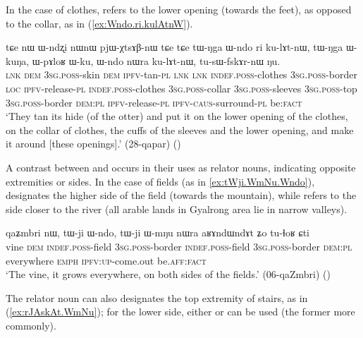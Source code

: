 In the case of clothes,  refers to the lower opening (towards the feet), as opposed to the collar, as in (\ref{ex:Wndo.ri.kulAtnW}).

\begin{exe}
\ex \label{ex:Wndo.ri.kulAtnW}
\gll tɕe nɯ ɯ-ndʐi nɯnɯ pjɯ-χtsɤβ-nɯ tɕe tɕe tɯ-ŋga ɯ-ndo ri ku-lɤt-nɯ, tɯ-ŋga ɯ-kuŋa, ɯ-pɤloʁ ɯ-ku, ɯ-ndo nɯra ku-lɤt-nɯ,  tu-sɯ-fskɤr-nɯ ŋu.   \\
\textsc{lnk} \textsc{dem} \textsc{3sg}.\textsc{poss}-skin \textsc{dem} \textsc{ipfv}-tan-\textsc{pl} \textsc{lnk} \textsc{lnk} \textsc{indef}.\textsc{poss}-clothes \textsc{3sg}.\textsc{poss}-border \textsc{loc} \textsc{ipfv}-release-\textsc{pl} \textsc{indef}.\textsc{poss}-clothes \textsc{3sg}.\textsc{poss}-collar \textsc{3sg}.\textsc{poss}-sleeves \textsc{3sg}.\textsc{poss}-top \textsc{3sg}.\textsc{poss}-border  \textsc{dem}:\textsc{pl}  \textsc{ipfv}-release-\textsc{pl} \textsc{ipfv}-\textsc{caus}-surround-\textsc{pl} be:\textsc{fact} \\
\glt `They tan its hide (of the otter) and put it on the lower opening of the clothes, on the collar of clothes, the cuffs of the sleeves and the lower opening, and make it around [these openings].' (28-qapar)
()
\end{exe} 


A contrast between  and  occurs in their uses as relator nouns, indicating opposite extremities or sides. In the case of fields (as in \ref{ex:tWji.WmNu.Wndo}),  designates the higher side of the field (towards the mountain), while  refers to the side closer to the river (all arable lands in Gyalrong area lie in narrow valleys).

\begin{exe}
\ex \label{ex:tWji.WmNu.Wndo}
\gll  qaʑmbri nɯ, tɯ-ji ɯ-ndo, tɯ-ji ɯ-mŋu nɯra aʁɤndɯndɤt ʑo tu-ɬoʁ ɕti \\
vine \textsc{dem} \textsc{indef}.\textsc{poss}-field \textsc{3sg}.\textsc{poss}-border \textsc{indef}.\textsc{poss}-field \textsc{3sg}.\textsc{poss}-border \textsc{dem}:\textsc{pl} everywhere \textsc{emph} \textsc{ipfv}:\textsc{up}-come.out be.\textsc{aff}:\textsc{fact} \\
\glt `The vine, it grows everywhere, on both sides of the fields.' (06-qaZmbri)
()
\end{exe}


The relator noun   can also designates the top extremity of stairs, as in (\ref{ex:rJAskAt.WmNu}); for the lower side, either  or  can be used (the former more commonly).

